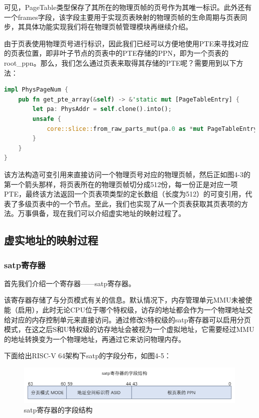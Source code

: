 可见，PageTable类型保存了其所在的物理页帧的页号作为其唯一标识。此外还有一个frames字段，该字段主要用于实现页表映射的物理页帧的生命周期与页表同步，其具体功能实现我们将在物理页帧管理模块再继续介绍。

由于页表使用物理页号进行标识，因此我们已经可以方便地使用PTE来寻找对应的页表位置，即非叶子节点的页表中的PTE存储的PPN，即为一个页表的root\_ppn。那么，我们怎么通过页表来取得其存储的PTE呢？需要用到以下方法：

\begin{lstlisting}[language={Rust}, label={code:address},
	caption={os/src/mm/page\_table.rs}]
impl PhysPageNum {
	pub fn get_pte_array(&self) -> &'static mut [PageTableEntry] {
		let pa: PhysAddr = self.clone().into();
		unsafe {
			core::slice::from_raw_parts_mut(pa.0 as *mut PageTableEntry, 512)
		}
	}
}
\end{lstlisting}

该方法构造可变引用来直接访问一个物理页号对应的物理页帧，然后正如图4-3的第一个箭头那样，将页表所在的物理页帧切分成512份，每一份正是对应一项PTE，最终该方法返回一个页表项类型的定长数组（长度为512）的可变引用，代表了多级页表中的一个节点。至此，我们也实现了从一个页表获取其页表项的方法。万事俱备，现在我们可以介绍虚实地址的映射过程了。

\subsection{虚实地址的映射过程}

\subsubsection{satp寄存器} 

首先我们介绍一个寄存器——satp寄存器。

该寄存器存储了与分页模式有关的信息。默认情况下，内存管理单元MMU未被使能（启用），此时无论CPU位于哪个特权级，访存的地址都会作为一个物理地址交给对应的内存控制单元来直接访问。通过修改S特权级的satp寄存器可以启用分页模式，在这之后S和U特权级的访存地址会被视为一个虚拟地址，它需要经过MMU的地址转换变为一个物理地址，再通过它来访问物理内存。

下面给出RISC-V 64架构下satp的字段分布，如图4-5：

\begin{figure}[h]
	\centering
	\includegraphics[width=.80\textwidth]{figures/04-01-satp寄存器的字段结构.png}
	\caption{satp寄存器的字段结构}
\end{figure}\FloatBarrier


